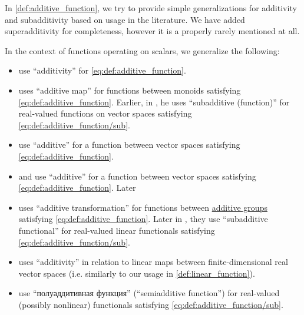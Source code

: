 \begin{remark}\label{rem:additive_function_terminology}
  In \cref{def:additive_function}, we try to provide simple generalizations for additivity and subadditivity based on usage in the literature. We have added superadditivity for completeness, however it is a properly rarely mentioned at all.

  In the context of functions operating on scalars, we generalize the following:
  \begin{itemize}
    \item {} use \enquote{additivity} for \eqref{eq:def:additive_function}.

    \item {} uses \enquote{additive map} for functions between monoids satisfying \eqref{eq:def:additive_function}. Earlier, in \cite[\S 7.1]{Schechter1997AnalysisHandbook}, he uses \enquote{subadditive (function)} for real-valued functions on vector spaces satisfying \eqref{eq:def:additive_function/sub}.

    \item {} use \enquote{additive} for a function between vector spaces satisfying \eqref{eq:def:additive_function}.

    \item {} and  use \enquote{additive} for a function between vector spaces satisfying \eqref{eq:def:additive_function}. Later \cite[342]{ЛюстерникСоболев1965ФункциональныйАнализ}

    \item {} uses \enquote{additive transformation} for functions between \hyperref[con:additive_semigroup]{additive groups} satisfying \eqref{eq:def:additive_function}. Later in \cite[def. 2.5.1]{HillePhillips1996FunctionalAnalysis}, they use \enquote{subadditive functional} for real-valued linear functionals satisfying \eqref{eq:def:additive_function/sub}.

    \item {} uses \enquote{additivity} in relation to linear maps between finite-dimensional real vector spaces (i.e. similarly to our usage in \cref{def:linear_function}).

    \item {} use \enquote{полуаддитивная функция} (\enquote{semiadditive function}) for real-valued (possibly nonlinear) functionals satisfying \eqref{eq:def:additive_function/sub}.


\end{itemize}
\end{remark}
